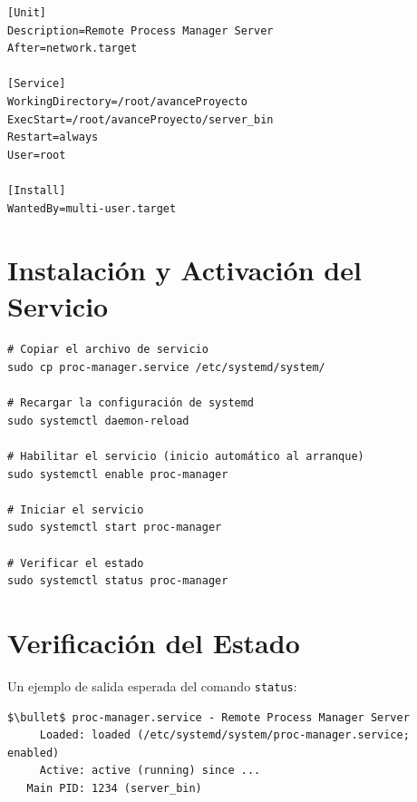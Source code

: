 \documentclass[12pt,a4paper]{report}
\begin{document}
\begin{lstlisting}[caption={Archivo proc-manager.service}, label={lst:systemd}]
[Unit]
Description=Remote Process Manager Server
After=network.target

[Service]
WorkingDirectory=/root/avanceProyecto
ExecStart=/root/avanceProyecto/server_bin
Restart=always
User=root

[Install]
WantedBy=multi-user.target
\end{lstlisting}

\section{Instalación y Activación del Servicio}

\begin{tcolorbox}[colback=black!85, colframe=black, title=\textcolor{white}{\textbf{Comandos Systemd}}]
\begin{lstlisting}[style=bashstyle, numbers=none]
# Copiar el archivo de servicio
sudo cp proc-manager.service /etc/systemd/system/

# Recargar la configuración de systemd
sudo systemctl daemon-reload

# Habilitar el servicio (inicio automático al arranque)
sudo systemctl enable proc-manager

# Iniciar el servicio
sudo systemctl start proc-manager

# Verificar el estado
sudo systemctl status proc-manager
\end{lstlisting}
\end{tcolorbox}

\section{Verificación del Estado}

Un ejemplo de salida esperada del comando \texttt{status}:

\begin{tcolorbox}[colback=grisClaro, colframe=verdeCodigo]
\begin{verbatim}
$\bullet$ proc-manager.service - Remote Process Manager Server
     Loaded: loaded (/etc/systemd/system/proc-manager.service; enabled)
     Active: active (running) since ...
   Main PID: 1234 (server_bin)
\end{verbatim}
\end{tcolorbox}

\end{document}
